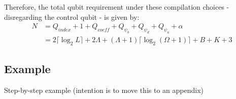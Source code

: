 Therefore, the total qubit requirement under these compilation choices - disregarding the control qubit - is given by:
\begin{equation}
    \begin{split}
        N &= Q_{\textit{index}} + 1 + Q_{\textit{coeff}} + Q_{\psi_b} + Q_{\psi_d} + Q_{\psi_a} + \alpha \\
        &= 2 \lceil \log_2{L} \rceil + 2 \Lambda + (\Lambda + 1) \lceil \log_2{(\Omega + 1)} \rceil + B + K + 3
    \end{split}
\end{equation}

\subsection{Example}
\label{subsec:example}
Step-by-step example (intention is to move this to an appendix)
